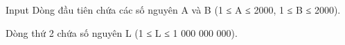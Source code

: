 Input
Dòng đầu tiên chứa các số nguyên A và B (1 ≤ A ≤ 2000, 1 ≤ B ≤ 2000).  

   Dòng thứ 2 chứa số nguyên L (1 ≤ L ≤ 1 000 000 000).